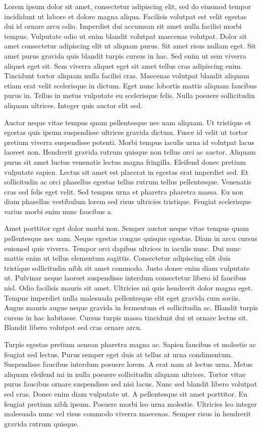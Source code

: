 Lorem ipsum dolor sit amet, consectetur adipiscing elit, sed do eiusmod tempor incididunt ut labore et dolore magna aliqua. Facilisis volutpat est velit egestas dui id ornare arcu odio. Imperdiet dui accumsan sit amet nulla facilisi morbi tempus. Vulputate odio ut enim blandit volutpat maecenas volutpat. Dolor sit amet consectetur adipiscing elit ut aliquam purus. Sit amet risus nullam eget. Sit amet purus gravida quis blandit turpis cursus in hac. Sed enim ut sem viverra aliquet eget sit. Sem viverra aliquet eget sit amet tellus cras adipiscing enim. Tincidunt tortor aliquam nulla facilisi cras. Maecenas volutpat blandit aliquam etiam erat velit scelerisque in dictum. Eget nunc lobortis mattis aliquam faucibus purus in. Tellus in metus vulputate eu scelerisque felis. Nulla posuere sollicitudin aliquam ultrices. Integer quis auctor elit sed.

Auctor neque vitae tempus quam pellentesque nec nam aliquam. Ut tristique et egestas quis ipsum suspendisse ultrices gravida dictum. Fusce id velit ut tortor pretium viverra suspendisse potenti. Morbi tempus iaculis urna id volutpat lacus laoreet non. Hendrerit gravida rutrum quisque non tellus orci ac auctor. Aliquam purus sit amet luctus venenatis lectus magna fringilla. Eleifend donec pretium vulputate sapien. Lectus sit amet est placerat in egestas erat imperdiet sed. Et sollicitudin ac orci phasellus egestas tellus rutrum tellus pellentesque. Venenatis cras sed felis eget velit. Sed tempus urna et pharetra pharetra massa. Eu non diam phasellus vestibulum lorem sed risus ultricies tristique. Feugiat scelerisque varius morbi enim nunc faucibus a.

Amet porttitor eget dolor morbi non. Semper auctor neque vitae tempus quam pellentesque nec nam. Neque egestas congue quisque egestas. Diam in arcu cursus euismod quis viverra. Tempor orci dapibus ultrices in iaculis nunc. Dui nunc mattis enim ut tellus elementum sagittis. Consectetur adipiscing elit duis tristique sollicitudin nibh sit amet commodo. Justo donec enim diam vulputate ut. Pulvinar neque laoreet suspendisse interdum consectetur libero id faucibus nisl. Odio facilisis mauris sit amet. Ultricies mi quis hendrerit dolor magna eget. Tempus imperdiet nulla malesuada pellentesque elit eget gravida cum sociis. Augue mauris augue neque gravida in fermentum et sollicitudin ac. Blandit turpis cursus in hac habitasse. Cursus turpis massa tincidunt dui ut ornare lectus sit. Blandit libero volutpat sed cras ornare arcu.

Turpis egestas pretium aenean pharetra magna ac. Sapien faucibus et molestie ac feugiat sed lectus. Purus semper eget duis at tellus at urna condimentum. Suspendisse faucibus interdum posuere lorem. A erat nam at lectus urna. Metus aliquam eleifend mi in nulla posuere sollicitudin aliquam ultrices. Tortor vitae purus faucibus ornare suspendisse sed nisi lacus. Nunc sed blandit libero volutpat sed cras. Donec enim diam vulputate ut. A pellentesque sit amet porttitor. Eu feugiat pretium nibh ipsum. Posuere morbi leo urna molestie. Ultricies leo integer malesuada nunc vel risus commodo viverra maecenas. Semper risus in hendrerit gravida rutrum quisque.

